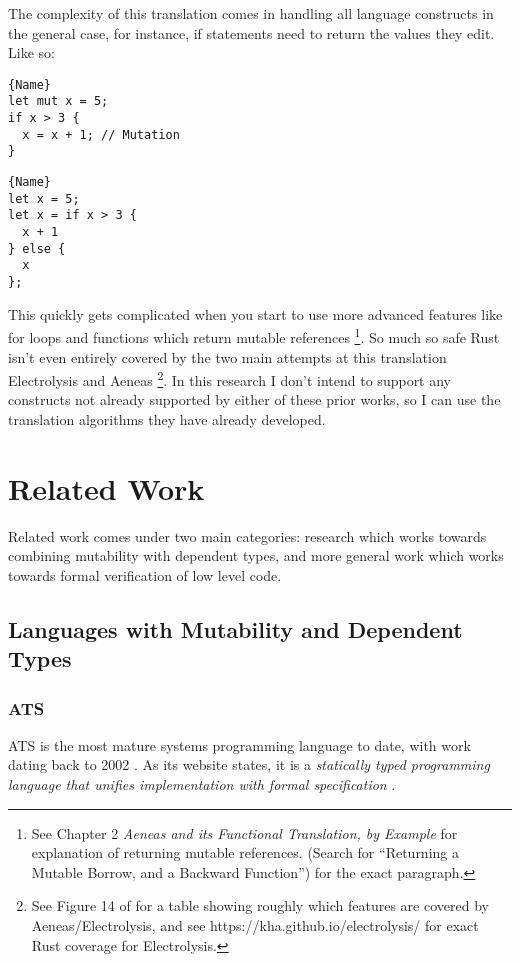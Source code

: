 \documentclass[12pt,twoside]{report}
\begin{document}
The complexity of this translation comes in handling all language constructs in the general case, for instance, if statements need to return the values they edit. Like so:

\noindent\begin{minipage}{.45\textwidth}
\begin{lstlisting}[caption=Original]{Name}
let mut x = 5;
if x > 3 {
  x = x + 1; // Mutation
}
\end{lstlisting}
\end{minipage}\hfill
\begin{minipage}{.45\textwidth}
\begin{lstlisting}[caption=Translated]{Name}
let x = 5;
let x = if x > 3 {
  x + 1
} else {
  x
};
\end{lstlisting}
\end{minipage}

This quickly gets complicated when you start to use more advanced features like for loops and functions which return mutable references \footnote{See \citep{aeneas} Chapter 2 \textit{Aeneas and its Functional Translation, by Example} for explanation of returning mutable references. (Search for ``Returning a Mutable Borrow, and a Backward Function'') for the exact paragraph.}. So much so safe Rust isn't even entirely covered by the two main attempts at this translation Electrolysis \citep{ullrich_khaelectrolysis_2024} and Aeneas \citep{aeneas} \footnote{See Figure 14 of \citep{aeneas} for a table showing roughly which features are covered by Aeneas/Electrolysis, and see https://kha.github.io/electrolysis/ for exact Rust coverage for Electrolysis.}. In this research I don't intend to support any constructs not already supported by either of these prior works, so I can use the translation algorithms they have already developed.

\section{Related Work}
Related work comes under two main categories: research which works towards combining mutability with dependent types, and more general work which works towards formal verification of low level code.

\subsection{Languages with Mutability and Dependent Types}

\subsubsection{ATS}
ATS \citep{xi_applied_2017} is the most mature systems programming language to date, with work dating back to 2002 \citep{ATSImplements}. As its website states, it is a \textit{statically typed programming language that unifies implementation with formal specification} \citep{ATSHome}.
\end{document}
